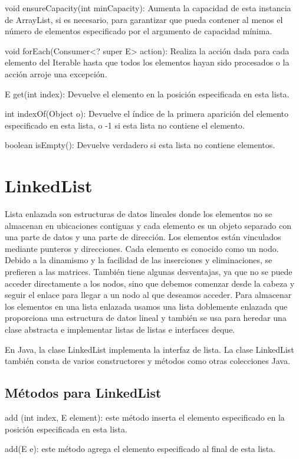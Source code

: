 \documentclass[12pt,a4paper]{report}
\begin{document}
{void ensureCapacity(int minCapacity): Aumenta la capacidad de esta instancia de ArrayList, si es necesario, para garantizar que pueda contener al menos el número de elementos especificado por el argumento de capacidad mínima.

void forEach(Consumer<? super E> action): Realiza la acción dada para cada elemento del Iterable hasta que todos los elementos hayan sido procesados o la acción arroje una excepción.

E get(int index): Devuelve el elemento en la posición especificada en esta lista.

int indexOf(Object o): Devuelve el índice de la primera aparición del elemento especificado en esta lista, o -1 si esta lista no contiene el elemento.

boolean isEmpty(): Devuelve verdadero si esta lista no contiene elementos.

\section*{LinkedList}
Lista enlazada son estructuras de datos lineales donde los elementos no se almacenan en ubicaciones contiguas y cada elemento es un objeto separado con una parte de datos y una parte de dirección. Los elementos están vinculados mediante punteros y direcciones. Cada elemento es conocido como un nodo. Debido a la dinamismo y la facilidad de las inserciones y eliminaciones, se prefieren a las matrices. También tiene algunas desventajas, ya que no se puede acceder directamente a los nodos, sino que debemos comenzar desde la cabeza y seguir el enlace para llegar a un nodo al que deseamos acceder.
Para almacenar los elementos en una lista enlazada usamos una lista doblemente enlazada que proporciona una estructura de datos lineal y también se usa para heredar una clase abstracta e implementar listas de listas e interfaces deque.

En Java, la clase LinkedList implementa la interfaz de lista. La clase LinkedList también consta de varios constructores y métodos como otras colecciones Java.

\subsection*{Métodos para LinkedList}
add (int index, E element): este método inserta el elemento especificado en la posición especificada en esta lista.

add(E e): este método agrega el elemento especificado al final de esta lista.

}
\end{document}
